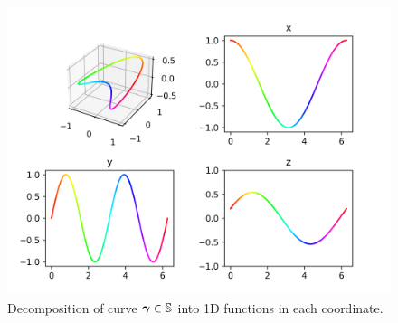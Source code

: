 \documentclass[../dissertation.tex]{subfiles}
\begin{document}
\begin{figure}[tbp]
    \centering
    \includegraphics[width=\textwidth]{sections/FourierSeriesImgs/FSProjection}
    \caption{Decomposition of curve $\boldsymbol{\gamma}\in\mathbb{S}$ into 1D functions in each coordinate.}
    \label{fig: Fourier series decomposition into 1D}
\end{figure}
\end{document}
